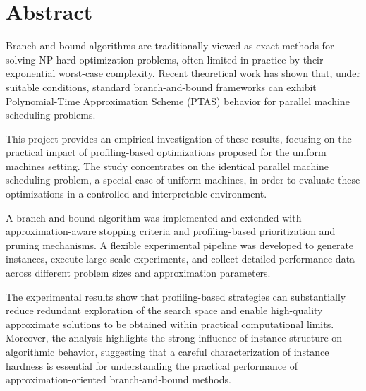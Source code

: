 \chapter{Abstract}
\label{ch:abstract}

Branch-and-bound algorithms are traditionally viewed as exact methods for solving NP-hard optimization problems, often limited in practice by their exponential worst-case complexity.
Recent theoretical work has shown that, under suitable conditions, standard branch-and-bound frameworks can exhibit Polynomial-Time Approximation Scheme (PTAS) behavior for parallel machine scheduling problems.

This project provides an empirical investigation of these results, focusing on the practical impact of profiling-based optimizations proposed for the uniform machines setting.
The study concentrates on the identical parallel machine scheduling problem, a special case of uniform machines, in order to evaluate these optimizations in a controlled and interpretable environment.

A branch-and-bound algorithm was implemented and extended with approximation-aware stopping criteria and profiling-based prioritization and pruning mechanisms.
A flexible experimental pipeline was developed to generate instances, execute large-scale experiments, and collect detailed performance data across different problem sizes and approximation parameters.

The experimental results show that profiling-based strategies can substantially reduce redundant exploration of the search space and enable high-quality approximate solutions to be obtained within practical computational limits.
Moreover, the analysis highlights the strong influence of instance structure on algorithmic behavior, suggesting that a careful characterization of instance hardness is essential for understanding the practical performance of approximation-oriented branch-and-bound methods.
